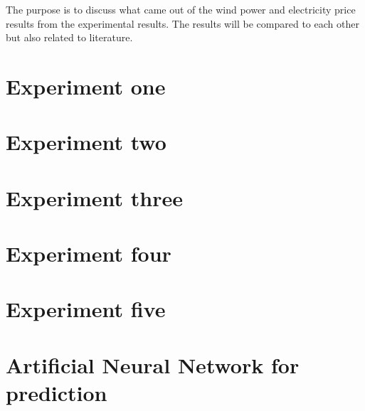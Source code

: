 The purpose is to discuss what came out of the wind power and electricity price results from the experimental results. The results will be compared to each other but also related to literature.

\section{Experiment one}
\label{sec:inputParameterDiscussion}

\newpage

\section{Experiment two}
\label{sec:matrixTrimmingDiscussion}


\newpage
\section{Experiment three}
\label{sec:calculatedInputDiscussion}


\newpage
\section{Experiment four}
\label{sec:blackBoxDiscussion}


\newpage
\section{Experiment five}
\label{sec:stepAheadForecastingDiscussion}


\newpage
\section{Artificial Neural Network for prediction}
\label{sec:annForPrediction}


